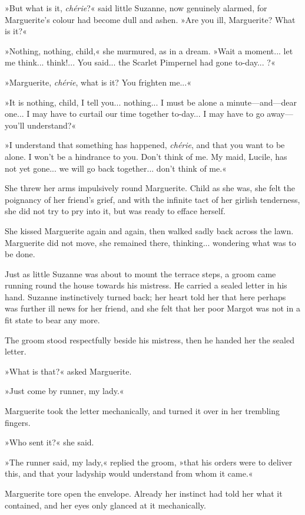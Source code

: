 »But what is it, \textit{chérie}?« said little Suzanne, now genuinely alarmed, for Marguerite's colour had become dull and ashen. »Are you ill, Marguerite? What is it?«

»Nothing, nothing, child,« she murmured, as in a dream. »Wait a moment... let me think... think!... You said... the Scarlet Pimpernel had gone to-day... ?«

»Marguerite, \textit{chérie}, what is it? You frighten me...«

»It is nothing, child, I tell you... nothing... I must be alone a minute\allowbreak---\allowbreak and\allowbreak---\allowbreak dear one... I may have to curtail our time together to-day... I may have to go away\allowbreak---\allowbreak you'll understand?«

»I understand that something has happened, \textit{chérie}, and that you want to be alone. I won't be a hindrance to you. Don't think of me. My maid, Lucile, has not yet gone... we will go back together... don't think of me.«

She threw her arms impulsively round Marguerite. Child as she was, she felt the poignancy of her friend's grief, and with the infinite tact of her girlish tenderness, she did not try to pry into it, but was ready to efface herself.

She kissed Marguerite again and again, then walked sadly back across the lawn. Marguerite did not move, she remained there, thinking... wondering what was to be done.

Just as little Suzanne was about to mount the terrace steps, a groom came running round the house towards his mistress. He carried a sealed letter in his hand. Suzanne instinctively turned back; her heart told her that here perhaps was further ill news for her friend, and she felt that her poor Margot was not in a fit state to bear any more.

The groom stood respectfully beside his mistress, then he handed her the sealed letter.

»What is that?« asked Marguerite.

»Just come by runner, my lady.«

Marguerite took the letter mechanically, and turned it over in her trembling fingers.

»Who sent it?« she said.

»The runner said, my lady,« replied the groom, »that his orders were to deliver this, and that your ladyship would understand from whom it came.«

Marguerite tore open the envelope. Already her instinct had told her what it contained, and her eyes only glanced at it mechanically.

